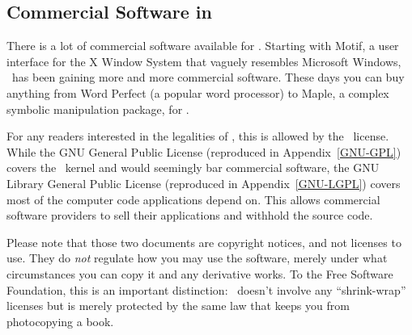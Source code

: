 \subsection{Commercial Software in \linux}

There is a lot of commercial software available for \linux.  Starting
with Motif, a user interface for the X Window
System that vaguely resembles Microsoft
Windows, \linux\ has been gaining more and
more commercial software.  These days you can buy anything from Word
Perfect (a popular word processor) to Maple, a complex symbolic
manipulation package, for \linux.

For any readers interested in the legalities of \linux, this is
allowed by the \linux\ license.  While the GNU General Public License
(reproduced in Appendix~\ref{GNU-GPL}) covers the \linux\ kernel and
would seemingly bar commercial software, the
GNU Library General Public License (reproduced in
Appendix~\ref{GNU-LGPL}) covers most of the computer code applications
depend on.
This allows commercial software providers to sell their applications
and withhold the source code.

Please note that those two documents are copyright notices, and not
licenses to use. They do {\em not\/} regulate how you may use the
software, merely under what circumstances you can copy it and any
derivative works.  To the Free Software Foundation, this is an
important distinction: \linux\ doesn't involve any ``shrink-wrap''
licenses but is merely protected by the same law that keeps you from
photocopying a book.

